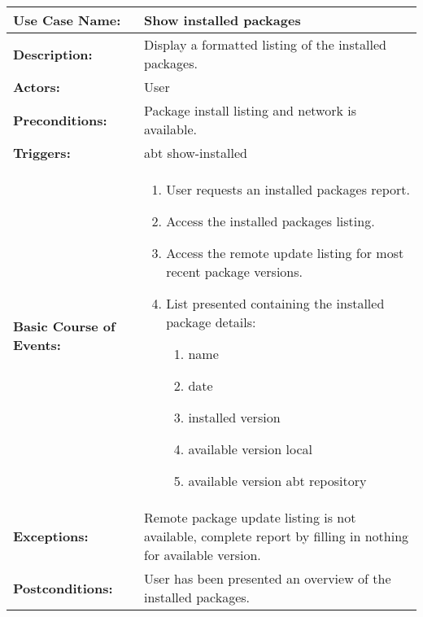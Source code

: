 
\begin{tabularx}{\linewidth}{|l|X|}
\hline
\textbf{Use Case Name:} & \textbf{Show installed packages} \\
\hline
\textbf{Description:} & Display a formatted listing of the installed packages. \\
\hline
\textbf{Actors:} & User \\
\hline
\textbf{Preconditions:} & Package install listing and network is available. \\
\hline
\textbf{Triggers:} & abt show-installed \\
\hline
\textbf{Basic Course of Events:} & 
\begin{minipage}{\linewidth} 
  \vspace{0.05em}
  \begin{enumerate}
    \item User requests an installed packages report.
    \item Access the installed packages listing.
    \item Access the remote update listing for most recent package versions.
    \item List presented containing the installed package details:
      \begin{enumerate}
        \item name
        \item date
        \item installed version
        \item available version local
        \item available version abt repository
      \end{enumerate}
  \end{enumerate}
  \vspace{0.05em}
\end{minipage}
\\
\hline 
\textbf{Exceptions:} & 
Remote package update listing is not available, complete report by filling in nothing for available version. \\
\hline 
\textbf{Postconditions:} &
User has been presented an overview of the installed packages. \\
\hline
\end{tabularx}

